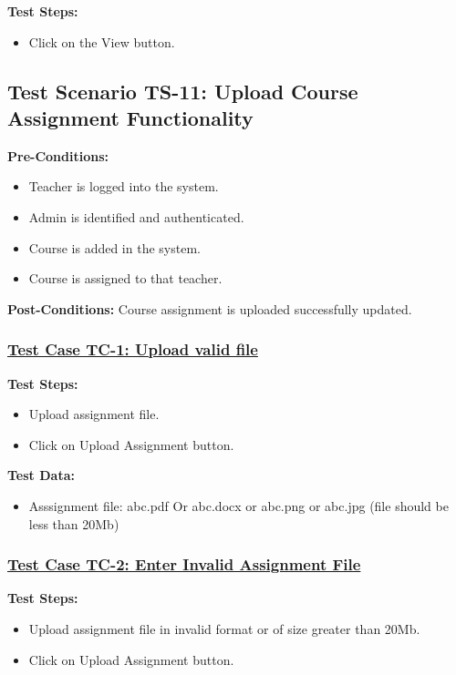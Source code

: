 \textbf{Test Steps:}
\begin{itemize}

\item Click on the View button.

\end{itemize}


\subsection{Test Scenario TS-11: Upload Course Assignment Functionality}
\textbf{Pre-Conditions: } 
\begin{itemize}

\item Teacher is logged into the system.
\item Admin is identified and authenticated.
\item Course is added in the system.
\item Course is assigned to that teacher.

\end{itemize}

\textbf{Post-Conditions: } Course assignment is uploaded successfully updated.
\subsubsection{\underline{Test Case TC-1: Upload valid file}}
\textbf{Test Steps:}
\begin{itemize}

\item Upload assignment file.
\item Click on Upload Assignment button.

\end{itemize}

\textbf{Test Data:}
\begin{itemize}

\item Asssignment file: abc.pdf Or abc.docx or abc.png or abc.jpg  (file should be less than 20Mb)


\end{itemize}

\subsubsection{\underline{Test Case TC-2: Enter Invalid Assignment File}}
\textbf{Test Steps:}
\begin{itemize}
\item Upload assignment file in invalid format or of size greater than 20Mb.
\item Click on Upload Assignment button.

\end{itemize}


